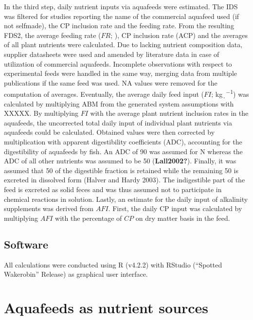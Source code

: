 \documentclass[preprint, 3p,
authoryear]{elsarticle} %
\begin{document}
In the third step, daily nutrient inputs via aquafeeds were estimated.
The IDS was filtered for studies reporting the name of the commercial
aquafeed used (if not selfmade), the CP inclusion rate and the feeding
rate. From the resulting FDS2, the average feeding rate (\(FR\);
\si{\p}), CP inclusion rate (ACP) and the averages of all plant
nutrients were calculated. Due to lacking nutrient composition data,
supplier datasheets were used and amended by literature data in case of
utilization of commercial aquafeeds. Incomplete observations with
respect to experimental feeds were handled in the same way, merging data
from multiple publications if the same feed was used. NA values were
removed for the computation of averages. Eventually, the average daily
feed input (\(FI\); \si{\kg\per\d}) was calculated by multiplying ABM
from the generated system assumptions with XXXXX. By multiplying \(FI\)
with the average plant nutrient inclusion rates in the aquafeeds, the
uncorrected total daily input of individual plant nutrients via
aquafeeds could be calculated. Obtained values were then corrected by
multiplication with apparent digestibility coefficients (ADC),
accounting for the digestibility of aquafeeds by fish. An ADC of
\SI{90}{\p} was assumed for N whereas the ADC of all other nutrients was
assumed to be \SI{50}{\p} (\textbf{Lall2002?}). Finally, it was assumed
that \SI{50}{\p} of the digestible fraction is retained while the
remaining \SI{50}{\p} is excreted in dissolved form (Halver and Hardy
2003). The indigestible part of the feed is excreted as solid feces and
was thus assumed not to participate in chemical reactions in solution.
Lastly, an estimate for the daily input of alkalinity supplements was
derived from \(AFI\). First, the daily CP input was calculated by
multiplying \(AFI\) with the percentage of \(CP\) on dry matter basis in
the feed.

\hypertarget{software}{%
\subsection{Software}\label{software}}

All calculations were conducted using R (v4.2.2) with RStudio (``Spotted
Wakerobin'' Release) as graphical user interface.

\hypertarget{aquafeeds-as-nutrient-sources}{%
\section{Aquafeeds as nutrient
sources}\label{aquafeeds-as-nutrient-sources}}
\end{document}
